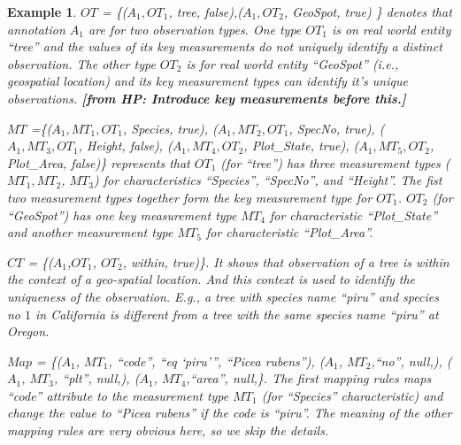 \documentclass[conference]{IEEEtran}
\newtheorem{example}{\bf Example}[section]
\newcommand{\from}[2]{{\bf[{\sc from #1:} #2]}}
\begin{document}
\begin{example}
$OT$ = \{($A_1, OT_1$, tree, false),($A_1, OT_2$, GeoSpot, true) \}
  denotes that annotation $A_1$ are for two observation types. One
  type $OT_1$ is on real world entity ``tree'' and the values of its key measurements
  do not uniquely identify a distinct observation. The other type
  $OT_2$ is for real world entity ``GeoSpot'' (i.e., geospatial
  location) and its key measurement types can identify it's unique
  observations. \from{HP}{Introduce key measurements before this.}

$MT$ =\{($A_1, MT_1, OT_1$, Species, true), 
($A_1, MT_2, OT_1$, SpecNo, true), 
($A_1, MT_3, OT_1$, Height, false),
($A_1, MT_4, OT_2$, Plot\_State, true), 
($A_1, MT_5, OT_2$, Plot\_Area, false)\} represents that $OT_1$
(for ``tree'') has three measurement types ($MT_1, MT_2$, $MT_3$) for characteristics
``Species'', ``SpecNo'', and ``Height''. The fist two measurement
  types together form the key measurement type for $OT_1$. 
$OT_2$ (for ``GeoSpot'') has one key measurement type $MT_4$ for
  characteristic ``Plot\_State'' and another measurement type $MT_5$
  for characteristic ``Plot\_Area''. 

$CT$ = \{($A_1$,$OT_1$, $OT_2$, within, true)\}. It shows that
observation of a {\em tree} is within the context of a geo-spatial
location. And this context is used to identify the uniqueness of the
observation. E.g., a tree with species name ``piru'' and species no
$1$ in California
is different from a tree with 
the same species name ``piru'' at Oregon. 


$Map$ = \{($A_1$, $MT_1$, ``code'', ``eq `piru''', ``Picea rubens''),
($A_1$, $MT_2$,``no'', null,), 
($A_1$, $MT_3$, ``plt'', null,), 
($A_1$, $MT_4$,``area'', null,\}. 
The first mapping rules maps ``code''
attribute to the measurement type $MT_1$ (for ``Species''
characteristic) and change the value to ``Picea rubens'' if the code
is ``piru''. The meaning of the other mapping rules are very
obvious here, so we skip the details. 
\end{example}
\end{document}
